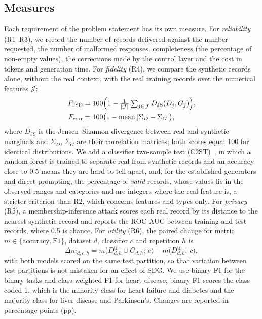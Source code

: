 \documentclass[conference]{IEEEtran}
\begin{document}
\subsection{Measures}
Each requirement of the problem statement has its own measure. For \emph{reliability} (R1--R3), we record the number of records delivered against the number requested, the number of malformed responses, completeness (the percentage of non-empty values), the corrections made by the control layer and the cost in tokens and generation time. For \emph{fidelity} (R4), we compare the synthetic records alone, without the real context, with the real training records over the numerical features $\mathcal{J}$:
\begin{equation}
\begin{aligned}
F_{\mathrm{JSD}}&=100\Bigl(1-\tfrac{1}{|\mathcal{J}|}
\textstyle\sum_{j\in\mathcal{J}}D_{\mathrm{JS}}(D_j,G_j)\Bigr),\\
F_{\mathrm{corr}}&=100\bigl(1-\operatorname{mean}|\Sigma_D-\Sigma_G|\bigr),
\end{aligned}
\label{eq:fidelity}
\end{equation}
where $D_{\mathrm{JS}}$ is the Jensen--Shannon divergence between real and synthetic marginals and $\Sigma_D$, $\Sigma_G$ are their correlation matrices; both scores equal 100 for identical distributions. We add a classifier two-sample test (C2ST)~\cite{lopezpaz2017c2st}, in which a random forest is trained to separate real from synthetic records and an accuracy close to 0.5 means they are hard to tell apart, and, for the established generators and direct prompting, the percentage of \emph{valid} records, whose values lie in the observed ranges and categories and are integers where the real feature is, a stricter criterion than R2, which concerns features and types only. For \emph{privacy} (R5), a membership-inference attack scores each real record by its distance to the nearest synthetic record and reports the ROC AUC between training and test records, where 0.5 is chance. For \emph{utility} (R6), the paired change for metric $m\in\{\mathrm{accuracy},\mathrm{F1}\}$, dataset $d$, classifier $c$ and repetition $h$ is
\begin{equation}
\Delta m_{d,c,h}=m\bigl(D^{\mathrm{tr}}_{d,h}\cup G_{d,h};\,c\bigr)-m\bigl(D^{\mathrm{tr}}_{d,h};\,c\bigr),
\label{eq:utility}
\end{equation}
with both models scored on the same test partition, so that variation between test partitions is not mistaken for an effect of SDG. We use binary F1 for the binary tasks and class-weighted F1 for heart disease; binary F1 scores the class coded 1, which is the minority class for heart failure and diabetes and the majority class for liver disease and Parkinson's. Changes are reported in percentage points (pp).
\end{document}
